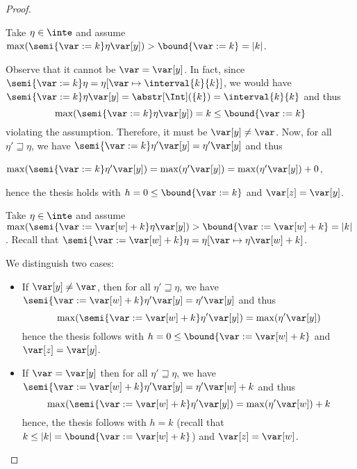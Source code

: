 \begin{proof}
\begin{inductive}
    Take \(\eta \in \inte\) and assume
    \(\max(\semi{\var := k}\eta \var[y]) > \bound{\var := k} = |k|\).

    Observe that it cannot be \(\var = \var[y]\). In fact, since
    \(\semi{\var := k}\eta = \eta[\var \mapsto \interval{k}{k}]\),
    we would have
    \(\semi{\var := k}\eta \var[y] = \abstr[\Int](\{k\}) =
    \interval{k}{k}\) and thus %
    \begin{equation*}
      \max(\semi{\var := k}\eta \var[y]) = k  \leq \bound{\var := k}
    \end{equation*}
    violating the assumption.
    Therefore, it must be \(\var[y] \neq \var\). Now, for all
    \(\eta' \sqsupseteq \eta\), we have
    \(\semi{\var := k}\eta' \var[y] = \eta' \var[y]\) and thus
    \begin{center}
      \(\max(\semi{\var := k}\eta' \var[y]) = \max(\eta' \var[y]) =
      \max(\eta' \var[y]) + 0\),
    \end{center}
    hence the thesis holds with \(h =0 \leq \bound{\var :=k}\) and \(\var[z] = \var[y]\).
    
    
    Take \(\eta \in \inte\) and assume
    \(\max(\semi{\var := \var[w] + k}\eta \var[y]) > \bound{\var :=
      \var[w] + k} = |k|\).
    Recall that
    \(\semi{\var := \var[w] + k}\eta = \eta[\var \mapsto \eta \var[w] + k]\).
    
    We distinguish two cases:
    \begin{itemize}
      
    \item If \(\var[y] \neq \var\), then for all \(\eta' \sqsupseteq \eta\), we have
      \(\semi{\var := \var[w] + k}\eta' \var[y] = \eta' \var[y]\) and thus
      \begin{equation*}
        \max(\semi{\var := \var[w] + k}\eta' \var[y]) = \max(\eta' \var[y])
      \end{equation*}
      hence the thesis follows with
      \(h =0 \leq \bound{\var := \var[w] + k}\) and \(\var[z] = \var[y]\).
      
    \item 
      If \(\var = \var[y]\) then  for all \(\eta' \sqsupseteq \eta\), we have
      \(\semi{\var := \var[w] + k}\eta' \var[y] = \eta' \var[w] +
      k\) and thus
      \begin{equation*}
        \max(\semi{\var := \var[w] + k}\eta' \var[y]) = \max(\eta' \var[w]) +
        k
      \end{equation*}
      hence, the thesis follows with \(h = k\) (recall that
      \(k \leq |k| = \bound{\var := \var[w] + k}\)) and
      \(\var[z] = \var[w]\).
    \end{itemize}


\end{inductive}
\end{proof}
